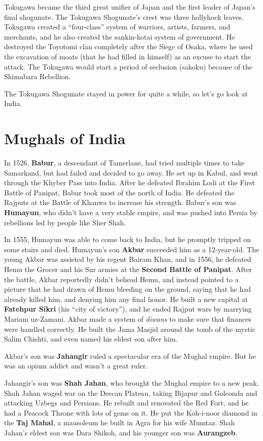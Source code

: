 Tokugawa became the third great unifier of Japan and the first leader of Japan's final shogunate.
The Tokugawa Shogunate's crest was three hollyhock leaves.
Tokugawa created a ``four-class'' system of warriors, artists, farmers, and merchants,
and he also created the sankin-kotai system of government.
He destroyed the Toyotomi clan completely after the Siege of Osaka,
where he used the excavation of moats (that he had filled in himself) as an excuse to start the attack.
The Tokugawa would start a period of seclusion (sakoku) because of the Shimabara Rebellion.

The Tokugawa Shogunate stayed in power for quite a while, so let's go look at India.

\section{Mughals of India}

In 1526, \textbf{Babur}, a descendant of Tamerlane,
had tried multiple times to take Samarkand, but had failed and decided to go away.
He set up in Kabul, and went through the Khyber Pass into India.
After he defeated Ibrahim Lodi at the First Battle of Panipat, Babur took most of the north of India.
He defeated the Rajputs at the Battle of Khanwa to increase his strength.
Babur's son was \textbf{Humayun}, who didn't have a very stable empire,
and was pushed into Persia by rebellions led by people like Sher Shah.

In 1555, Humayun was able to come back to India, but he promptly tripped on some stairs and died.
Humayun's son \textbf{Akbar} succeeded him as a 12-year-old.
The young Akbar was assisted by his regent Bairam Khan,
and in 1556, he defeated Hemu the Grocer and his Sur armies at the \textbf{Second Battle of Panipat}.
After the battle, Akbar reportedly didn't behead Hemu,
and instead pointed to a picture that he had drawn of Hemu bleeding on the ground,
saying that he had already killed him, and denying him any final honor.
He built a new capital at \textbf{Fatehpur Sikri} (his ``city of victory''),
and he ended Rajput wars by marrying Mariam uz-Zamani.
Akbar made a system of \textit{diwans} to make sure that finances were handled correctly.
He built the Jama Masjid around the tomb of the mystic Salim Chishti,
and even named his eldest son after him.

Akbar's son was \textbf{Jahangir} ruled a spectacular era of the Mughal empire.
But he was an opium addict and wasn't a great ruler.

Jahangir's son was \textbf{Shah Jahan}, who brought the Mughal empire to a new peak.
Shah Jahan waged war on the Deccan Plateau, taking Bijapur and Golconda and attacking Uzbegs and Persians.
He rebuilt and renovated the Red Fort, and he had a Peacock Throne with lots of gems on it.
He put the Koh-i-noor diamond in the \textbf{Taj Mahal}, a mausoleum he built in Agra for his wife Mumtaz.
Shah Jahan's eldest son was Dara Shikoh, and his younger son was \textbf{Aurangzeb}.

